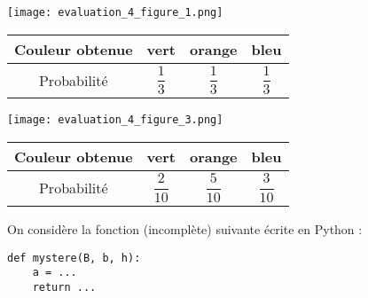 \documentclass[a4paper,dvipsnames]{article}
\begin{document}
\begin{multicols}{2}
  \begin{center}
    \texttt{[image: evaluation\_4\_figure\_1.png]}
  \end{center}

  \begin{center}
    \vspace*{0.7cm}
    \hspace*{-3cm}\begin{tabular}{@{}cccc@{}}
      \toprule
      Couleur obtenue & vert & orange & bleu\\
      \midrule
      Probabilité & {\color{red}$\dfrac{1}{3}$} & {\color{red}$\dfrac{1}{3}$} & {\color{red}$\dfrac{1}{3}$}\\
      \bottomrule
    \end{tabular}
  \end{center}
\end{multicols}

\begin{multicols}{2}
  \begin{center}
    \texttt{[image: evaluation\_4\_figure\_3.png]}
  \end{center}

  \begin{center}
    \vspace*{0.75cm}
    \hspace*{-3cm}\begin{tabular}{@{}cccc@{}}
      \toprule
      Couleur obtenue & vert & orange & bleu\\
      \midrule
      Probabilité & {\color{red}$\dfrac{2}{10}$} & {\color{red}$\dfrac{5}{10}$} & {\color{red}$\dfrac{3}{10}$}\\
      \bottomrule
    \end{tabular}
  \end{center}
\end{multicols}

\bigskip

\exo On considère la fonction (incomplète) suivante écrite en Python :

\begin{verbatim}
def mystere(B, b, h):
    a = ...
    return ...
\end{verbatim}
\end{document}

